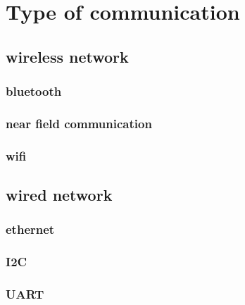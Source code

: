 \section{Type of communication}

\subsection{wireless network}
\subsubsection{bluetooth}
\subsubsection{near field communication}
\subsubsection{wifi}

\subsection{wired network}
\subsubsection{ethernet}
\subsubsection{I2C}
\subsubsection{UART}

